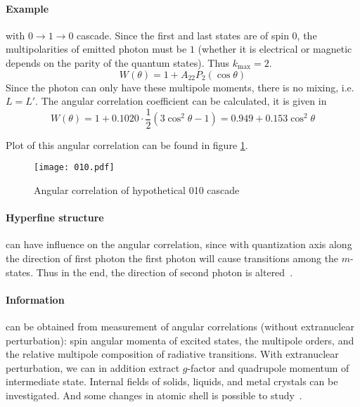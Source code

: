\paragraph{Example} with $0 \rightarrow 1 \rightarrow 0$ \gag cascade. Since the first and last states are of spin $0$, the multipolarities of emitted photon must be $1$ (whether it is electrical or magnetic depends on the parity of the quantum states). Thus $k_\text{max} = 2$.
\begin{equation}
   W(\theta) = 1 + A_{22} P_2(\cos \theta)
   \label{math:W010}
\end{equation}
Since the photon can only have these multipole moments, there is no mixing, i.e.~$L=L'$. The angular correlation coefficient can be calculated, it is given in~\cite{siegbahn}
\begin{equation}
   W(\theta) = 1 + 0.1020 \cdot \frac{1}{2} \left( 3 \cos^2 \theta - 1 \right) = 0.949 + 0.153 \cos^2 \theta
\end{equation}

Plot of this angular correlation can be found in figure \ref{W010}.
\begin{figure}[ht]
   \centering
   \texttt{[image: 010.pdf]}
   \caption{Angular correlation of hypothetical 010 cascade}%
   \label{W010}
\end{figure}

\paragraph{Hyperfine structure} can have influence on the angular correlation, since with quantization axis along the direction of first photon the first photon will cause transitions among the $m$-states. Thus in the end, the direction of second photon is altered~\cite{siegbahn}.


\paragraph{Information} can be obtained from measurement of \gag angular correlations (without extranuclear perturbation): spin angular momenta of excited states, the multipole orders, and the relative multipole composition of radiative transitions\cite{RAWilson}. With extranuclear perturbation, we can in addition extract $g$-factor and quadrupole momentum of intermediate state. Internal fields of solids, liquids, and metal crystals can be investigated. And some changes in atomic shell is possible to study~\cite{siegbahn}.



